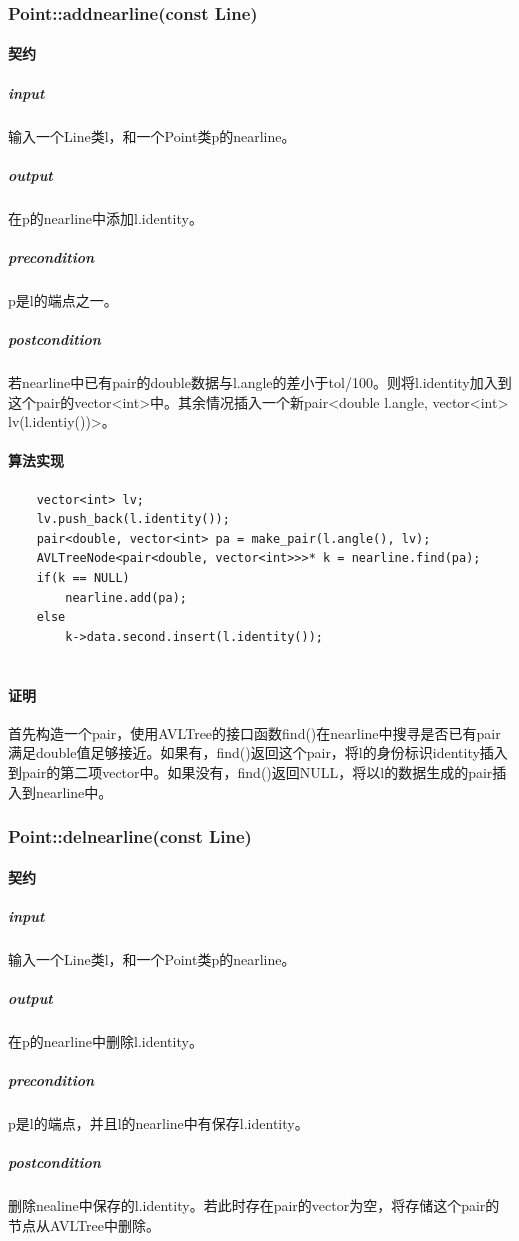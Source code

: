 \documentclass[a4paper]{book}
\numberwithin{equation}{chapter}
\theoremstyle{definition}
\begin{document}
\subsubsection{Point::addnearline(const Line)}
\paragraph{契约}
\subparagraph{input}
输入一个Line类l，和一个Point类p的nearline。
\subparagraph{output}
在p的nearline中添加l.identity。
\subparagraph{precondition}
p是l的端点之一。
\subparagraph{postcondition}
若nearline中已有pair的double数据与l.angle的差小于tol/100。则将l.identity加入到这个pair的vector<int>中。其余情况插入一个新pair<double l.angle, vector<int> lv(l.identiy())>。
\paragraph{算法实现}
\begin{lstlisting}
	vector<int> lv;
	lv.push_back(l.identity());
	pair<double, vector<int> pa = make_pair(l.angle(), lv);
	AVLTreeNode<pair<double, vector<int>>>* k = nearline.find(pa);
	if(k == NULL)
		nearline.add(pa);
	else
		k->data.second.insert(l.identity());
	
\end{lstlisting}
\paragraph{证明}
首先构造一个pair，使用AVLTree的接口函数find()在nearline中搜寻是否已有pair满足double值足够接近。如果有，find()返回这个pair，将l的身份标识identity插入到pair的第二项vector中。如果没有，find()返回NULL，将以l的数据生成的pair插入到nearline中。

\subsubsection{Point::delnearline(const Line)}
\paragraph{契约}
\subparagraph{input}
输入一个Line类l，和一个Point类p的nearline。
\subparagraph{output}
在p的nearline中删除l.identity。
\subparagraph{precondition}
p是l的端点，并且l的nearline中有保存l.identity。
\subparagraph{postcondition}
删除nealine中保存的l.identity。若此时存在pair的vector为空，将存储这个pair的节点从AVLTree中删除。
\end{document}

